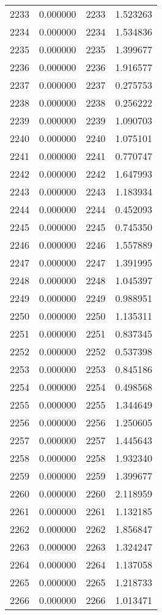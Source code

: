 \documentclass[12pt]{article}
\begin{document}
\begin{longtable}{@{}cccc@{}}
2233 & 0.000000 & 2233 & 1.523263 \\
2234 & 0.000000 & 2234 & 1.534836 \\
2235 & 0.000000 & 2235 & 1.399677 \\
2236 & 0.000000 & 2236 & 1.916577 \\
2237 & 0.000000 & 2237 & 0.275753 \\
2238 & 0.000000 & 2238 & 0.256222 \\
2239 & 0.000000 & 2239 & 1.090703 \\
2240 & 0.000000 & 2240 & 1.075101 \\
2241 & 0.000000 & 2241 & 0.770747 \\
2242 & 0.000000 & 2242 & 1.647993 \\
2243 & 0.000000 & 2243 & 1.183934 \\
2244 & 0.000000 & 2244 & 0.452093 \\
2245 & 0.000000 & 2245 & 0.745350 \\
2246 & 0.000000 & 2246 & 1.557889 \\
2247 & 0.000000 & 2247 & 1.391995 \\
2248 & 0.000000 & 2248 & 1.045397 \\
2249 & 0.000000 & 2249 & 0.988951 \\
2250 & 0.000000 & 2250 & 1.135311 \\
2251 & 0.000000 & 2251 & 0.837345 \\
2252 & 0.000000 & 2252 & 0.537398 \\
2253 & 0.000000 & 2253 & 0.845186 \\
2254 & 0.000000 & 2254 & 0.498568 \\
2255 & 0.000000 & 2255 & 1.344649 \\
2256 & 0.000000 & 2256 & 1.250605 \\
2257 & 0.000000 & 2257 & 1.445643 \\
2258 & 0.000000 & 2258 & 1.932340 \\
2259 & 0.000000 & 2259 & 1.399677 \\
2260 & 0.000000 & 2260 & 2.118959 \\
2261 & 0.000000 & 2261 & 1.132185 \\
2262 & 0.000000 & 2262 & 1.856847 \\
2263 & 0.000000 & 2263 & 1.324247 \\
2264 & 0.000000 & 2264 & 1.137058 \\
2265 & 0.000000 & 2265 & 1.218733 \\
2266 & 0.000000 & 2266 & 1.013471 \\

\end{longtable}
\end{document}
